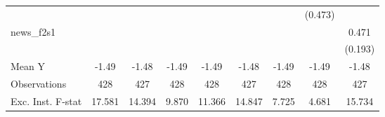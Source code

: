 {\begin{tabular}{l*{8}{c}}
            &                     &                     &                     &                     &                     &                     &     (0.473)         &                     \\
\addlinespace
news\_f2s1   &                     &                     &                     &                     &                     &                     &                     &       0.471\sym{**} \\
            &                     &                     &                     &                     &                     &                     &                     &     (0.193)         \\
\midrule
Mean Y      &       -1.49         &       -1.48         &       -1.49         &       -1.49         &       -1.48         &       -1.49         &       -1.49         &       -1.48         \\
Observations&         428         &         427         &         428         &         428         &         427         &         428         &         428         &         427         \\
Exc. Inst. F-stat&      17.581         &      14.394         &       9.870         &      11.366         &      14.847         &       7.725         &       4.681         &      15.734         \\
\bottomrule
\end{tabular}
}
